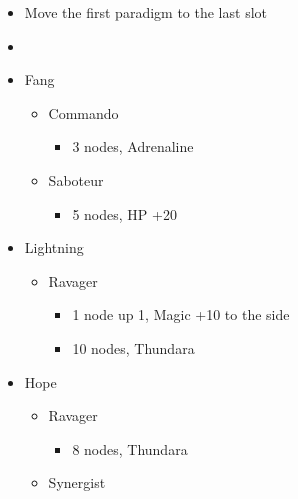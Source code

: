 \begin{menu}
\begin{multicols}{2}
\begin{itemize}
    \paradigm
    \begin{itemize}
        \item Move the first paradigm to the last slot
        \item {}%
{\paradigmline{[\com]}{\com}{\rav}}
{\paradigmline{[\com]}{\rav}{\rav}}%
{\paradigmline{(\sab)}{(\rav)}{\rav}}%
{\paradigmline{\sen}{(\rav)}{(\rav)}}%
{\paradigmline[5]{\textit{\sab}}{\textit{(\rav)}}{\textit{\syn}}}%
{\paradigmline{\com}{\rav}{\rav}}
    \end{itemize}
    \crystarium
    \begin{itemize}
        \item Fang
        \begin{itemize}
            \item Commando
            \begin{itemize}
                \item 3 nodes, Adrenaline
            \end{itemize}
            \item Saboteur
            \begin{itemize}
                \item 5 nodes, HP +20
            \end{itemize}
        \end{itemize}
        \item Lightning
        \begin{itemize}
            \item Ravager
            \begin{itemize}
                \item 1 node up 1, Magic +10 to the side
                \item 10 nodes, Thundara
            \end{itemize}
        \end{itemize}
        \item Hope
        \begin{itemize}
            \item Ravager
            \begin{itemize}
                 \item 8 nodes, Thundara
            \end{itemize}
            \item Synergist

\end{itemize}
\end{itemize}
\end{itemize}
\end{multicols}
\end{menu}
